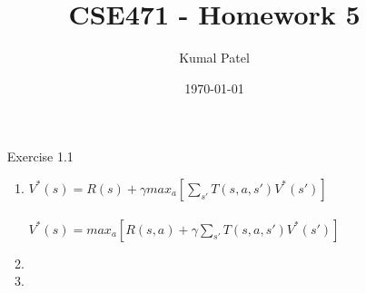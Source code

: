 \documentclass[letterpaper, 12pt]{article}
\title{CSE471 - Homework 5}
\author{Kumal Patel}
\date{\today}
\begin{document}
   
\maketitle



\begin{enumerate}
    \item[Exercise 1.1] 
        \begin{enumerate}
            \item $V^*(s) = R(s) + \gamma max_a[\sum\limits_{s'} T(s,a,s')V^*(s')]$ \\\\
              $V^*(s) = max_a[R(s,a) + \gamma \sum\limits_{s'} T(s,a,s')V^*(s')]$
            \item 
            \item 
        \end{enumerate}
        

\end{enumerate}
\end{document}
